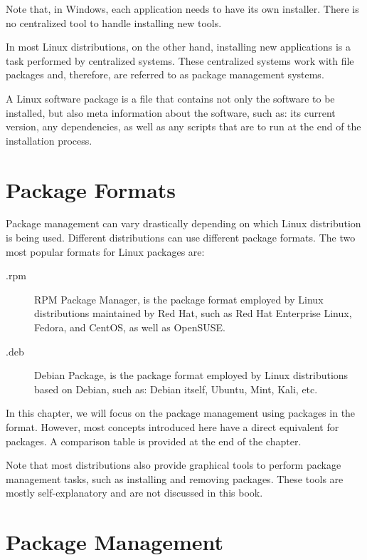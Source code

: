 Note that, in Windows, each application needs to have its own installer. There is no centralized tool to handle installing new tools.

In most Linux distributions, on the other hand, installing new applications is a task performed by centralized systems. These centralized systems work with file packages and, therefore, are referred to as package management systems.

A Linux software package is a file that contains not only the software to be installed, but also meta information about the software, such as: its current version, any dependencies, as well as any scripts that are to run at the end of the installation process.

\section{Package Formats}
\label{sec:package_formats}

Package management can vary drastically depending on which Linux distribution is being used. Different distributions can use different package formats. The two most popular formats for Linux packages are:

\begin{description}
\item[.rpm] RPM Package Manager, is the package format employed by Linux distributions maintained by Red Hat, such as Red Hat Enterprise Linux, Fedora, and CentOS, as well as OpenSUSE.
\item[.deb] Debian Package, is the package format employed by Linux distributions based on Debian, such as: Debian itself, Ubuntu, Mint, Kali, etc.
\end{description}

In this chapter, we will focus on the package management using packages in the  format. However, most concepts introduced here have a direct equivalent for  packages. A comparison table is provided at the end of the chapter.

Note that most distributions also provide graphical tools to perform package management tasks, such as installing and removing packages. These tools are mostly self-explanatory and are not discussed in this book.

\section{Package Management}

